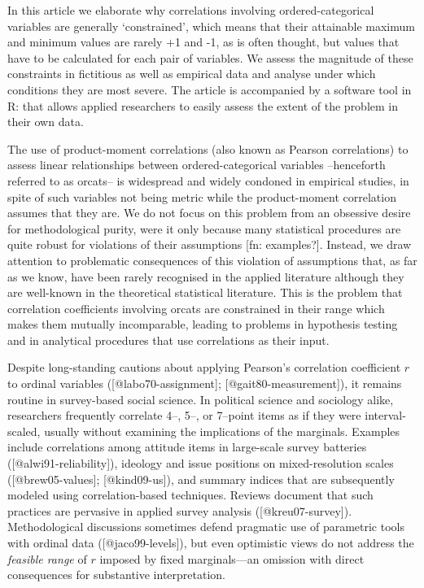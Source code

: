 \documentclass[
  12pt,
]{article}
\theoremstyle{plain}
\theoremstyle{definition}
\theoremstyle{remark}
\begin{document}
In this article we elaborate why correlations involving
ordered-categorical variables are generally `constrained', which means
that their attainable maximum and minimum values are rarely +1 and -1,
as is often thought, but values that have to be calculated for each pair
of variables. We assess the magnitude of these constraints in fictitious
as well as empirical data and analyse under which conditions they are
most severe. The article is accompanied by a software tool in R: that
allows applied researchers to easily assess the extent of the problem in
their own data.

The use of product-moment correlations (also known as Pearson
correlations) to assess linear relationships between ordered-categorical
variables --henceforth referred to as orcats-- is widespread and widely
condoned in empirical studies, in spite of such variables not being
metric while the product-moment correlation assumes that they are. We do
not focus on this problem from an obsessive desire for methodological
purity, were it only because many statistical procedures are quite
robust for violations of their assumptions {[}fn: examples?{]}. Instead,
we draw attention to problematic consequences of this violation of
assumptions that, as far as we know, have been rarely recognised in the
applied literature although they are well-known in the theoretical
statistical literature. This is the problem that correlation
coefficients involving orcats are constrained in their range which makes
them mutually incomparable, leading to problems in hypothesis testing
and in analytical procedures that use correlations as their input.

Despite long-standing cautions about applying Pearson’s correlation coefficient \(r\) to ordinal variables ([@labo70-assignment]; [@gait80-measurement]), it remains routine in survey-based social science. In political science and sociology alike, researchers frequently correlate 4–, 5–, or 7–point items as if they were interval-scaled, usually without examining the implications of the marginals. Examples include correlations among attitude items in large-scale survey batteries ([@alwi91-reliability]), ideology and issue positions on mixed-resolution scales ([@brew05-values]; [@kind09-us]), and summary indices that are subsequently modeled using correlation-based techniques. Reviews document that such practices are pervasive in applied survey analysis ([@kreu07-survey]). Methodological discussions sometimes defend pragmatic use of parametric tools with ordinal data ([@jaco99-levels]), but even optimistic views do not address the \emph{feasible range} of \(r\) imposed by fixed marginals—an omission with direct consequences for substantive interpretation.
\end{document}
